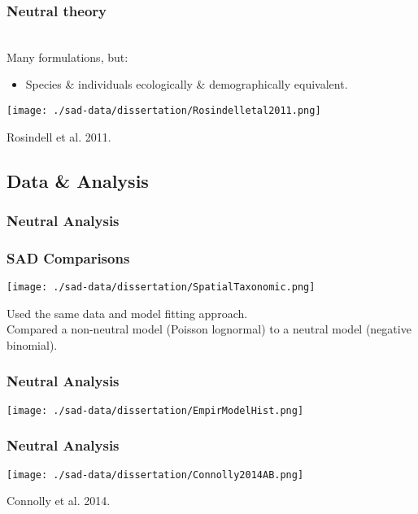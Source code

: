 \documentclass[14pt]{beamer}
\begin{document}
\begin{frame}[t]
\frametitle{Neutral theory}
~\\
Many formulations, but:
~\\
\begin{itemize}
\item Species \& individuals ecologically \& demographically equivalent.\\
\end{itemize}
\texttt{[image: ./sad-data/dissertation/Rosindelletal2011.png]}\\
\begin{tiny}
Rosindell et al. 2011.
\end{tiny}
\end{frame}



\subsection{Data & Analysis}
\begin{frame}
\frametitle{Neutral Analysis}
\frametitle{SAD Comparisons}
\begin{center}
\texttt{[image: ./sad-data/dissertation/SpatialTaxonomic.png]}
\end{center}
Used the same data and model fitting approach.\\
Compared a non-neutral model (Poisson lognormal) to a neutral model (negative binomial).\\
\end{frame}

\begin{frame}{}
\frametitle{Neutral Analysis}
\texttt{[image: ./sad-data/dissertation/EmpirModelHist.png]}
\end{frame}

\begin{frame}{}
\frametitle{Neutral Analysis}
\texttt{[image: ./sad-data/dissertation/Connolly2014AB.png]}
\begin{tiny}
Connolly et al. 2014.
\end{tiny}
\end{frame}
\end{document}
